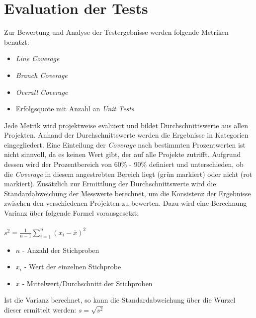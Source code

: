 \section{Evaluation der Tests}\label{section:eval}
Zur Bewertung und Analyse der Testergebnisse werden folgende Metriken benutzt: 
\begin{itemize}
    \setlength{\parskip}{1pt}
    \item \textit{Line Coverage}
    \item \textit{Branch Coverage}
    \item \textit{Overall Coverage}
    \item Erfolgsquote mit Anzahl an \textit{Unit Tests}
\end{itemize}
Jede Metrik wird projektweise evaluiert und bildet Durchschnittswerte aus allen Projekten. Anhand der Durchschnittswerte werden die Ergebnisse in Kategorien eingegliedert. Eine Einteilung der \textit{Coverage} nach bestimmten Prozentwerten ist nicht sinnvoll, da es keinen Wert gibt, der auf alle Projekte zutrifft. Aufgrund dessen wird der Prozentbereich von 60\% - 90\% definiert und unterschieden, ob die \textit{Coverage} in diesem angestrebten Bereich liegt (grün markiert) oder nicht (rot markiert). \cite{WhatReasonableCode} Zusätzlich zur Ermittlung der Durchschnittswerte wird die Standardabweichung der Messwerte berechnet, um die Konsistenz der Ergebnisse zwischen den verschiedenen Projekten zu bewerten. Dazu wird eine Berechnung  Varianz über folgende Formel vorausgesetzt:\\\\
$s^2 = \frac{1}{n-1} \displaystyle\sum_{i=1}^{n} (x_i - \bar{x})^2$
\begin{itemize}
    \setlength{\parskip}{1pt}
    \item $n$ - Anzahl der Stichproben
    \item $x_i$ - Wert der einzelnen Stichprobe
    \item $\bar{x}$ - Mittelwert/Durchschnitt der Stichproben
\end{itemize}
Ist die Varianz berechnet, so kann die Standardabweichung über die Wurzel dieser ermittelt werden: 
$s=\sqrt{s^2}$


